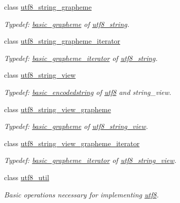 \begin{DoxyCompactItemize}
class \hyperlink{classu5e_1_1utf8__string__grapheme}{utf8\+\_\+string\+\_\+grapheme}
\begin{DoxyCompactList}\small\item\em Typedef\+: \hyperlink{classu5e_1_1basic__grapheme}{basic\+\_\+grapheme} of \hyperlink{classu5e_1_1utf8__string}{utf8\+\_\+string}. \end{DoxyCompactList}\item 
class \hyperlink{classu5e_1_1utf8__string__grapheme__iterator}{utf8\+\_\+string\+\_\+grapheme\+\_\+iterator}
\begin{DoxyCompactList}\small\item\em Typedef\+: \hyperlink{classu5e_1_1basic__grapheme__iterator}{basic\+\_\+grapheme\+\_\+iterator} of \hyperlink{classu5e_1_1utf8__string}{utf8\+\_\+string}. \end{DoxyCompactList}\item 
class \hyperlink{classu5e_1_1utf8__string__view}{utf8\+\_\+string\+\_\+view}
\begin{DoxyCompactList}\small\item\em Typedef\+: \hyperlink{classu5e_1_1basic__encodedstring}{basic\+\_\+encodedstring} of \hyperlink{classu5e_1_1utf8}{utf8} and string\+\_\+view. \end{DoxyCompactList}\item 
class \hyperlink{classu5e_1_1utf8__string__view__grapheme}{utf8\+\_\+string\+\_\+view\+\_\+grapheme}
\begin{DoxyCompactList}\small\item\em Typedef\+: \hyperlink{classu5e_1_1basic__grapheme}{basic\+\_\+grapheme} of \hyperlink{classu5e_1_1utf8__string__view}{utf8\+\_\+string\+\_\+view}. \end{DoxyCompactList}\item 
class \hyperlink{classu5e_1_1utf8__string__view__grapheme__iterator}{utf8\+\_\+string\+\_\+view\+\_\+grapheme\+\_\+iterator}
\begin{DoxyCompactList}\small\item\em Typedef\+: \hyperlink{classu5e_1_1basic__grapheme__iterator}{basic\+\_\+grapheme\+\_\+iterator} of \hyperlink{classu5e_1_1utf8__string__view}{utf8\+\_\+string\+\_\+view}. \end{DoxyCompactList}\item 
class \hyperlink{classu5e_1_1utf8__util}{utf8\+\_\+util}
\begin{DoxyCompactList}\small\item\em Basic operations necessary for implementing \hyperlink{classu5e_1_1utf8}{utf8}. \end{DoxyCompactList}\end{DoxyCompactItemize}
